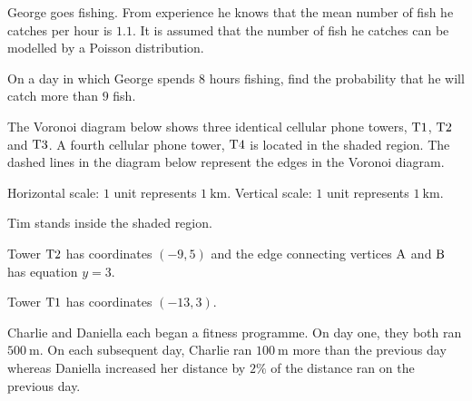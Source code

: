 \documentclass{source/ib}
\begin{document}
\begin{questions}
\question George goes fishing. From experience he knows that the mean number of fish he catches per hour is $1.1$. It is assumed that the number of fish he catches can be modelled by a Poisson distribution. 

On a day in which George spends $8$ hours fishing, find the probability that he will catch more than $9$ fish. 

\makeanswerbox
\newpage

\question The Voronoi diagram below shows three identical cellular phone towers, $\mathrm T1$, $\mathrm T2$ and $\mathrm T3$. A fourth cellular phone tower, $\mathrm T4$ is located in the shaded region. The dashed lines in the diagram below represent the edges in the Voronoi diagram.

Horizontal scale: $1$ unit represents $\SI{1}{\km}$. \linebreak
Vertical scale: $1$ unit represents $\SI{1}{\km}$.

Tim stands inside the shaded region. 
Tower $\mathrm T2$ has coordinates $(−9 , 5)$ and the edge connecting vertices $\mathrm A$ and $\mathrm B$ has equation $y = 3$.
Tower $\mathrm T1$ has coordinates $(-13,3)$.

\bigskip\continue
\makeanswerbox
\newpage

\question Charlie and Daniella each began a fitness programme. On day one, they both ran $\SI{500}{\m}$. On each subsequent day, Charlie ran $\SI{100}{\m}$ more than the previous day whereas Daniella increased her distance by $2\%$ of the distance ran on the previous day.


\end{questions}
\end{document}
